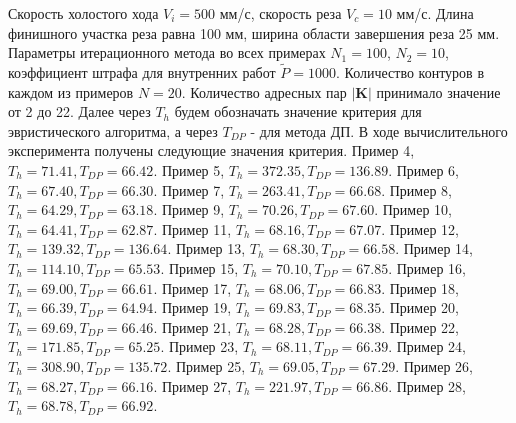 \documentclass[11pt,twoside,openany]{report}
\begin{document}
{{Скорость холостого хода $V_i=500$ мм/с, скорость реза $V_c=10$ мм/с.
Длина финишного участка реза равна 100 мм, ширина области завершения реза 25 мм.
Параметры итерационного метода во всех примерах $N_1=100$, $N_2=10$,
коэффициент штрафа для внутренних работ $\tilde{P}=1000$.
Количество контуров в каждом из примеров $N=20$.
Количество адресных пар $|\mathbf{K}|$ принимало значение от 2 до 22.
Далее через $T_h$ будем обозначать значение критерия для эвристического
алгоритма, а через $T_{DP}$ - для метода ДП.
В ходе вычислительного эксперимента получены следующие значения критерия.\newline
Пример 4, $T_h=71.41, T_{DP}=66.42$.\newline
Пример 5, $T_h=372.35, T_{DP}=136.89$.\newline
Пример 6, $T_h=67.40, T_{DP}=66.30$.\newline
Пример 7, $T_h=263.41, T_{DP}=66.68$.\newline
Пример 8, $T_h=64.29, T_{DP}=63.18$.\newline
Пример 9, $T_h=70.26, T_{DP}=67.60$.\newline
Пример 10, $T_h=64.41, T_{DP}=62.87$.\newline
Пример 11, $T_h=68.16, T_{DP}=67.07$.\newline
Пример 12, $T_h=139.32, T_{DP}=136.64$.\newline
Пример 13, $T_h=68.30, T_{DP}=66.58$.\newline
Пример 14, $T_h=114.10, T_{DP}=65.53$.\newline
Пример 15, $T_h=70.10, T_{DP}=67.85$.\newline
Пример 16, $T_h=69.00, T_{DP}=66.61$.\newline
Пример 17, $T_h=68.06, T_{DP}=66.83$.\newline
Пример 18, $T_h=66.39, T_{DP}=64.94$.\newline
Пример 19, $T_h=69.83, T_{DP}=68.35$.\newline
Пример 20, $T_h=69.69, T_{DP}=66.46$.\newline
Пример 21, $T_h=68.28, T_{DP}=66.38$.\newline
Пример 22, $T_h=171.85, T_{DP}=65.25$.\newline
Пример 23, $T_h=68.11, T_{DP}=66.39$.\newline
Пример 24, $T_h=308.90, T_{DP}=135.72$.\newline
Пример 25, $T_h=69.05, T_{DP}=67.29$.\newline
Пример 26, $T_h=68.27, T_{DP}=66.16$.\newline
Пример 27, $T_h=221.97, T_{DP}=66.86$.\newline
Пример 28, $T_h=68.78, T_{DP}=66.92$.\newline

}}
\end{document}

